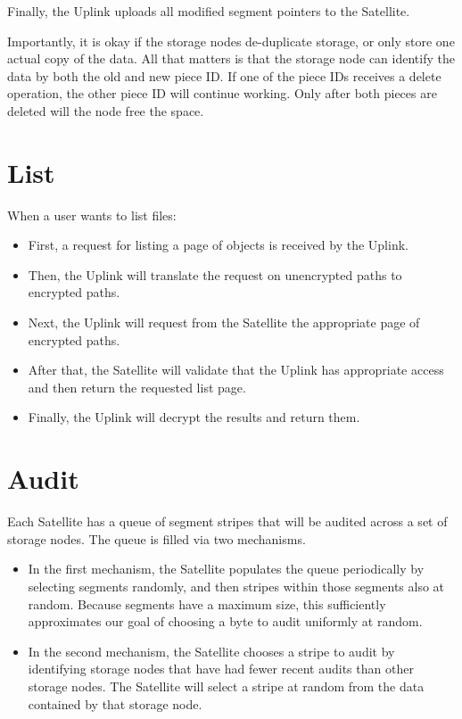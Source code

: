 \documentclass[8pt,fleqn,openany]{book}
\begin{document}
Finally, the Uplink uploads all modified segment pointers to the Satellite.

Importantly, it is okay if the storage nodes de-duplicate storage, or only
store one actual copy of the data. All that matters is that the storage node
can identify the data by both the old and new piece ID. If one of the piece
IDs receives a delete operation, the other piece ID will continue working.
Only after both pieces are deleted will the node free the space.

\section{List}

When a user wants to list files:

\begin{itemize}
\item First, a request for listing a page of objects is received by the Uplink.
\item Then, the Uplink will translate the request on unencrypted paths to encrypted
  paths.
\item Next, the Uplink will request from the Satellite the appropriate page of
  encrypted paths.
\item After that, the Satellite will validate that the Uplink has appropriate access
  and then return the requested list page.
\item Finally, the Uplink will decrypt the results and return them.
\end{itemize}

\section{Audit}

Each Satellite has a queue of segment stripes that will be audited across
  a set of storage nodes. The queue is filled via two mechanisms.
  \begin{itemize}
  \item In the first mechanism, the Satellite populates the queue periodically
    by selecting segments randomly, and then stripes within those segments also
    at random. Because segments have a maximum size, this sufficiently
    approximates our goal of choosing a byte to audit uniformly at random.
  \item In the second mechanism, the Satellite chooses a stripe to audit by
    identifying storage nodes that have had fewer recent audits than other
    storage nodes. The Satellite will select a stripe at random from the data
    contained by that storage node.
  \end{itemize}
\end{document}
